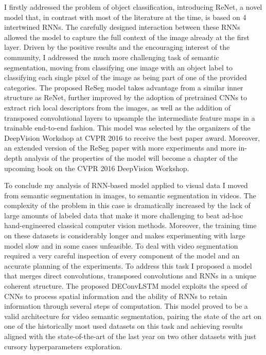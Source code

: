 I firstly addressed the problem of object classification, introducing ReNet, a
novel model that, in contrast with most of the literature at the time, is
based on 4 intertwined RNNs. The carefully designed interaction between these
RNNs allowed the model to capture the full context of the image already at the
first layer. Driven by the positive results and the encouraging interest of
the community, I addressed the much more challenging task of semantic
segmentation, moving from classifying one image with an object label to
classifying each single pixel of the image as being part of one of the provided
categories. The proposed ReSeg model takes advantage from a similar inner
structure as ReNet, further improved by the adoption of pretrained CNNs to
extract rich local descriptors from the images, as well as the addition of
transposed convolutional layers to upsample the intermediate feature maps in a
trainable end-to-end fashion. This model was selected by the organizers of the
DeepVision Workshop at CVPR 2016 to receive the best paper award. Moreover, an
extended version of the ReSeg paper with more experiments and more in-depth
analysis of the properties of the model will become a chapter of the upcoming
book on the CVPR 2016 DeepVision Workshop.

To conclude my analysis of RNN-based model applied to visual data I moved from
semantic segmentation in images, to semantic segmentation in videos. The
complexity of the problem in this case is dramatically increased by the lack of
large amounts of labeled data that make it more challenging to beat ad-hoc
hand-engineered classical computer vision methods. Moreover, the training time
on these datasets is considerably longer and makes experimenting with large
model slow and in some cases unfeasible. To deal with video segmentation
required a very careful inspection of every component of the model and an
accurate planning of the experiments. To address this task I proposed a model
that merges direct convolutions, transposed convolutions and RNNs in a unique
coherent structure. The proposed DEConvLSTM model exploits the speed of CNNs to
process spatial information and the ability of RNNs to retain information
through several steps of computation. This model proved to be a valid
architecture for video semantic segmentation, pairing the state of the art on
one of the historically most used datasets on this task and achieving results
aligned with the state-of-the-art of the last year on two other datasets with
just cursory hyperparameters exploration.


